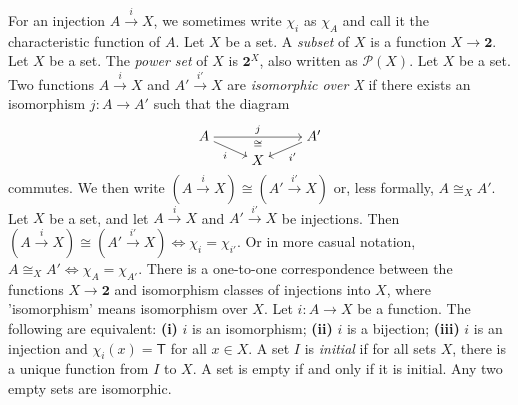  For an injection $A \xrightarrow{i} X$, we sometimes write $\chi_i$ as $\chi_A$ and call it the characteristic function of $A$.
 Let $X$ be a set. A \textit{subset} of $X$ is a function $X \to \mathbf{2}$.
 Let $X$ be a set. The \textit{power set} of $X$ is $\mathbf{2}^X$, also written as $\mathscr{P}(X)$.
 Let $X$ be a set. Two functions $A \xrightarrow{i} X$ and $A' \xrightarrow{i'} X$ are \textit{isomorphic over X} if there exists an isomorphism $j \colon A \to A'$ such that the diagram
\[\begin{tikzcd}[cramped,row sep=tiny]
	A && {A'} \\
	& X
	\arrow["j", "\cong"', from=1-1, to=1-3]
	\arrow["i"', from=1-1, to=2-2]
	\arrow["{i'}", from=1-3, to=2-2]
\end{tikzcd}\]
commutes. We then write $(A \xrightarrow{i} X) \cong (A' \xrightarrow{i'} X)$ or, less formally, $A \cong_X A'$.
 Let $X$ be a set, and let $A \xrightarrow{i} X$ and $A' \xrightarrow{i'} X$ be injections. Then $(A \xrightarrow{i} X) \cong (A' \xrightarrow{i'} X) \iff \chi_i = \chi_{i'}$. Or in more casual notation, $A \cong_X A' \iff \chi_A = \chi_{A'}$.
 There is a one-to-one correspondence between the functions $X \to \mathbf{2}$ and isomorphism classes of injections into $X$, where 'isomorphism' means isomorphism over $X$.
 Let $i \colon A \to X$ be a function. The following are equivalent: \textbf{(i)} $i$ is an isomorphism; \textbf{(ii)} $i$ is a bijection; \textbf{(iii)} $i$ is an injection and $\chi_i(x) = \mathsf{T}$ for all $x \in X$.
 A set $I$ is \textit{initial} if for all sets $X$, there is a unique function from $I$ to $X$.
 A set is empty if and only if it is initial.
 Any two empty sets are isomorphic.